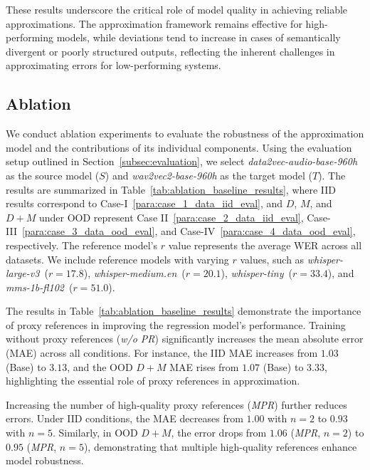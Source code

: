 These results underscore the critical role of model quality in achieving reliable approximations. The approximation framework remains effective for high-performing models, while deviations tend to increase in cases of semantically divergent or poorly structured outputs, reflecting the inherent challenges in approximating errors for low-performing systems.







\subsection{Ablation}\label{subsec:ablation}
We conduct ablation experiments to evaluate the robustness of the approximation model and the contributions of its individual components. Using the evaluation setup outlined in Section~\ref{subsec:evaluation}, we select \textit{data2vec-audio-base-960h} as the source model (\(S\)) and \textit{wav2vec2-base-960h} as the target model (\(T\)). The results are summarized in Table~\ref{tab:ablation_baseline_results}, where IID results correspond to Case-I~\ref{para:case_1_data_iid_eval}, and \(D\), \(M\), and \(D+M\) under OOD represent Case II~\ref{para:case_2_data_iid_eval}, Case-III~\ref{para:case_3_data_ood_eval}, and Case-IV~\ref{para:case_4_data_ood_eval}, respectively. The reference model's $r$ value represents the average WER across all datasets. We include reference models with varying $r$ values, such as \textit{whisper-large-v3}~($r=17.8$), \textit{whisper-medium.en}~($r=20.1$), \textit{whisper-tiny}~($r=33.4$), and \textit{mms-1b-fl102}~($r=51.0$).


The results in Table~\ref{tab:ablation_baseline_results} demonstrate the importance of proxy references in improving the regression model's performance. Training without proxy references (\textit{w/o PR}) significantly increases the mean absolute error (MAE) across all conditions. For instance, the IID MAE increases from \(1.03\) (Base) to \(3.13\), and the OOD \(D+M\) MAE rises from \(1.07\) (Base) to \(3.33\), highlighting the essential role of proxy references in approximation.


Increasing the number of high-quality proxy references (\textit{MPR}) further reduces errors. Under IID conditions, the MAE decreases from \(1.00\) with \(n=2\) to \(0.93\) with \(n=5\). Similarly, in OOD \(D+M\), the error drops from \(1.06\) (\textit{MPR}, \(n=2\)) to \(0.95\) (\textit{MPR}, \(n=5\)), demonstrating that multiple high-quality references enhance model robustness.

